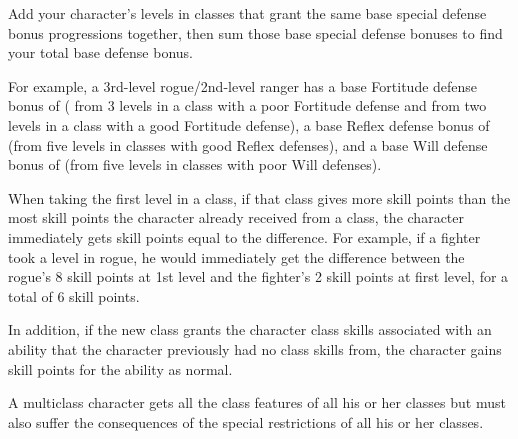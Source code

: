  Add your character's levels in classes that grant the same base special defense bonus progressions together, then sum those base special defense bonuses to find your total base defense bonus.

\par For example, a 3rd-level rogue/2nd-level ranger has a base Fortitude defense bonus of  ( from 3 levels in a class with a poor Fortitude defense and  from two levels in a class with a good Fortitude defense), a base Reflex defense bonus of  (from five levels in classes with good Reflex defenses), and a base Will defense bonus of  (from five levels in classes with poor Will defenses).

 When taking the first level in a class, if that class gives more skill points than the most skill points the character already received from a class, the character immediately gets skill points equal to the difference. For example, if a fighter took a level in rogue, he would immediately get the difference between the rogue's 8 skill points at 1st level and the fighter's 2 skill points at first level, for a total of 6 skill points.

\par In addition, if the new class grants the character class skills associated with an ability that the character previously had no class skills from, the character gains skill points for the ability as normal.

 A multiclass character gets all the class features
of all his or her classes but must also suffer the consequences of the
special restrictions of all his or her classes.

